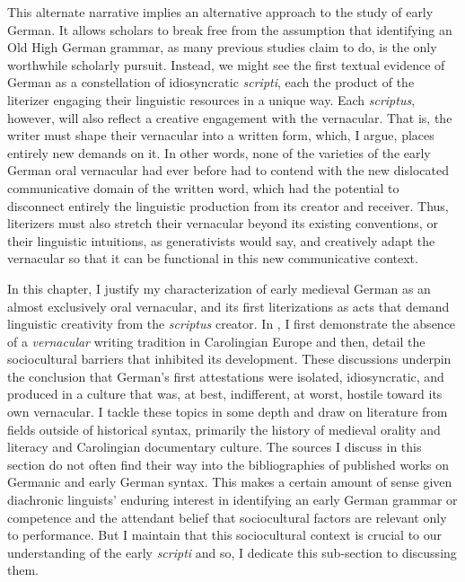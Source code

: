 This alternate narrative implies an alternative approach to the study of early German. It allows scholars to break free from the assumption that identifying an Old High German grammar, as many previous studies claim to do, is the only worthwhile scholarly pursuit. Instead, we might see the first textual evidence of German as a constellation of idiosyncratic \textit{scripti}, each the product of the literizer engaging their linguistic resources in a unique way. Each \textit{scriptus}, however, will also reflect a creative engagement with the vernacular. That is, the writer must shape their vernacular into a written form, which, I argue, places entirely new demands on it. In other words, none of the varieties of the early German oral vernacular had ever before had to contend with the new dislocated communicative domain of the written word, which had the potential to disconnect entirely the linguistic production from its creator and receiver. Thus, literizers must also stretch their vernacular beyond its existing conventions, or their linguistic intuitions, as generativists would say, and creatively adapt the vernacular so that it can be functional in this new communicative context.

In this chapter, I justify my characterization of early medieval German as an almost exclusively oral vernacular, and its first literizations as acts that demand linguistic creativity from the \textit{scriptus} creator. In , I first demonstrate the absence of a \textit{vernacular} writing tradition in Carolingian Europe and then, detail the sociocultural barriers that inhibited its development. These discussions underpin the conclusion that German’s first attestations were isolated, idiosyncratic, and produced in a culture that was, at best, indifferent, at worst, hostile toward its own vernacular. I tackle these topics in some depth and draw on literature from fields outside of historical syntax, primarily the history of medieval orality and literacy and Carolingian documentary culture. The sources I discuss in this section do not often find their way into the bibliographies of published works on Germanic and early German syntax. This makes a certain amount of sense given diachronic linguists’ enduring interest in identifying an early German grammar or competence and the attendant belief that sociocultural factors are relevant only to performance. But I maintain that this sociocultural context is crucial to our understanding of the early \textit{scripti} and so, I dedicate this sub-section to discussing them.

